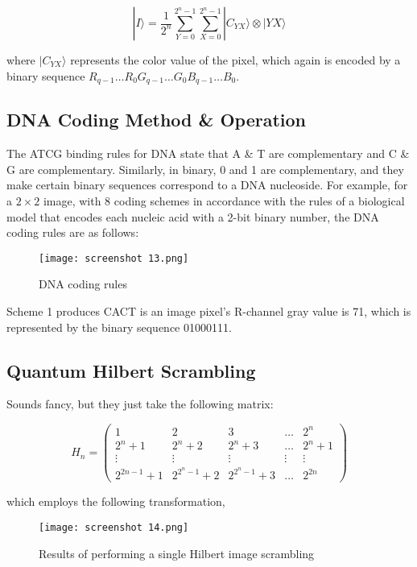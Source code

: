 \documentclass[svgnames]{article}     %
\begin{document}
\[
  |I\rangle = \frac{1}{2^n} \sum_{Y=0}^{2^n - 1} \sum_{X=0}^{2^n - 1}
  |C_{YX}\rangle \otimes |YX\rangle
\] \vspace{3px}

where $|C_{YX}\rangle$ represents the color value of the pixel, which again is
encoded by a binary sequence $R_{q-1}\hdots R_0 G_{q-1}\hdots G_0 B_{q-1}\hdots
B_0$. \\


\subsection{DNA Coding Method \& Operation}

The ATCG binding rules for DNA state that A \& T are complementary and C \&
G are complementary. Similarly, in binary, 0 and 1 are complementary, and they
make certain binary sequences correspond to a DNA nucleoside. For example, for
a $2 \times 2$ image, with 8 coding schemes in accordance with the rules of
a biological model that encodes each nucleic acid with a 2-bit binary number, the DNA coding rules are as follows: 

\begin{figure}[H]
  \centering
    \texttt{[image: screenshot 13.png]}
    \caption{DNA coding rules}
\end{figure}


Scheme 1 produces CACT is an image pixel's R-channel gray value is 71, which is
represented by the binary sequence 01000111. 

\subsection{Quantum Hilbert Scrambling} 

Sounds fancy, but they just take the following matrix: 

\[
H_n = \begin{pmatrix}
  1 & 2 & 3 & \hdots & 2^n \\ 2^n + 1 & 2^n + 2 & 2^n + 3 & \hdots & 2^n + 1 \\
  \vdots & \vdots & \vdots & \vdots & \vdots \\
  2^{2n-1} + 1 & 2^{2^n -1} + 2 & 2^{2^n-1} + 3 & \hdots & 2^{2n}
\end{pmatrix} 
\] \vspace{3px}

which employs the following transformation,

\begin{figure}[H]
  \centering
    \texttt{[image: screenshot 14.png]}
    \caption{Results of performing a single Hilbert image scrambling}
\end{figure}
\end{document}
